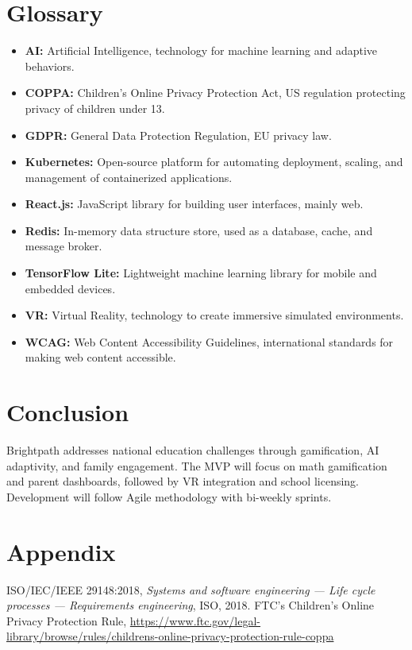 \documentclass[12pt,a4paper]{article}
\begin{document}
\section{Glossary}
\begin{itemize}[leftmargin=*]
  \item \textbf{AI:} Artificial Intelligence, technology for machine learning and adaptive behaviors.
  \item \textbf{COPPA:} Children's Online Privacy Protection Act, US regulation protecting privacy of children under 13.
  \item \textbf{GDPR:} General Data Protection Regulation, EU privacy law.
  \item \textbf{Kubernetes:} Open-source platform for automating deployment, scaling, and management of containerized applications.
  \item \textbf{React.js:} JavaScript library for building user interfaces, mainly web.
  \item \textbf{Redis:} In-memory data structure store, used as a database, cache, and message broker.
  \item \textbf{TensorFlow Lite:} Lightweight machine learning library for mobile and embedded devices.
  \item \textbf{VR:} Virtual Reality, technology to create immersive simulated environments.
  \item \textbf{WCAG:} Web Content Accessibility Guidelines, international standards for making web content accessible.
\end{itemize}

\section{Conclusion}
Brightpath addresses national education challenges through gamification, AI adaptivity, and family engagement. The MVP will focus on math gamification and parent dashboards, followed by VR integration and school licensing. Development will follow Agile methodology with bi-weekly sprints.

\section*{Appendix}

\begin{thebibliography}{9}
 ISO/IEC/IEEE 29148:2018, \textit{Systems and software engineering — Life cycle processes — Requirements engineering}, ISO, 2018.
 FTC's Children's Online Privacy Protection Rule, \url{https://www.ftc.gov/legal-library/browse/rules/childrens-online-privacy-protection-rule-coppa}
\end{thebibliography}
\end{document}
